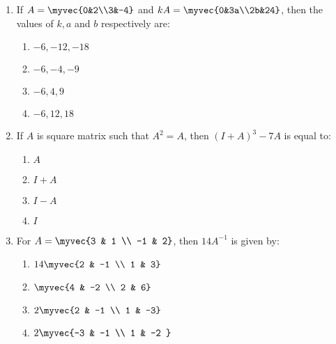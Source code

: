 \documentclass{article}
\begin{document}
\begin{enumerate}
    \item If $A =\myvec{0&2\\3&-4}$ and $kA =\myvec{0&3a\\2b&24}$, then the values of $k ,a$ and $b$ respectively are:
    \begin{enumerate}
        \item $-6, -12, -18$
        \item $-6, -4, -9$
        \item $-6, 4, 9$
        \item $-6, 12, 18$
    \end{enumerate}
    
    \item If $A$ is square matrix such that $A^2 = A$, then $(I + A)^3 - 7A$ is equal to:
    \begin{enumerate}
        \item $A$
        \item $I + A$
        \item $I - A$
        \item $I$ 
    \end{enumerate}
    
    \item For $A =
        \myvec{3 & 1 \\ -1 & 2}$, then $14A^{-1}$ is given by:
    \begin{enumerate}
        \item $14 \myvec{2 & -1 \\ 1 & 3}$
        \item $\myvec{4 & -2 \\ 2 & 6}$
        \item $2\myvec{2 & -1 \\ 1 & -3}$
        \item $2\myvec{-3 & -1 \\ 1 & -2 }$
    \end{enumerate}
    

\end{enumerate}
\end{document}
